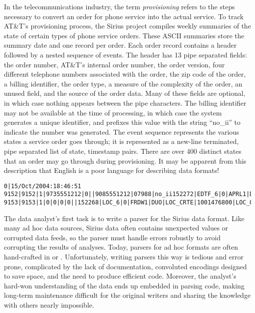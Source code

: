 \documentclass{sigplanconf}
\newcommand{\dibbler}{Sirius}
\begin{document}
In the telecommunications industry, the term \textit{provisioning} refers to
the steps necessary to convert an order for phone service into the
actual service.  To track AT\&T's provisioning process, the \dibbler{}
project compiles weekly summaries of the state of certain types of
phone service orders.  These ASCII summaries store the summary date
and one record per order.  Each order record contains a header
followed by a nested sequence of events.  The header has 13 pipe
separated fields: the order number, AT\&T's internal order number, the
order version, four different telephone numbers associated with the
order, the zip code of the order, a billing identifier, the order
type, a measure of the complexity of the order, an unused field, and
the source of the order data.  Many of these fields are optional, in
which case nothing appears between the pipe characters.  The billing
identifier may not be available at the time of processing, in which
case the system generates a unique identifier, and prefixes this value
with the string ``no\_ii'' to indicate the number was generated. The
event sequence represents the various states a service order goes
through; it is represented as a new-line terminated, pipe separated
list of state, timestamp pairs.  There are over 400 distinct states
that an order may go through during provisioning.  It may be apparent from
this description that English is a poor language for describing data
formats!

\begin{figure*}
\begin{small}
\begin{center}
\begin{verbatim}
0|15/Oct/2004:18:46:51
9152|9152|1|9735551212|0||9085551212|07988|no_ii152272|EDTF_6|0|APRL1|DUO|10|16/Oct/2004:10:02:10
9153|9153|1|0|0|0|0||152268|LOC_6|0|FRDW1|DUO|LOC_CRTE|1001476800|LOC_OS_10|17/Oct/2004:08:14:21
\end{verbatim}
\caption{Tiny example of \dibbler{} provisioning data.}
\label{figure:dibbler-records}
\end{center}
\end{small}
\end{figure*}

The data analyst's first task is to write a parser for the
\dibbler{} data  format.  Like many ad hoc data sources, \dibbler{} data
often contains unexpected values or corrupted data feeds, so the
parser must handle errors robustly to avoid corrupting the results of
analyses.  Today, parsers for ad hoc formats are often hand-crafted in 
\perl{} or \C{}.  Unfortunately, writing parsers this way is tedious and
error prone, complicated by the lack of documentation, convoluted
encodings designed to save space, and the need to produce efficient
code.  Moreover, the analyst's hard-won understanding of the data ends
up embedded in parsing code, making long-term maintenance difficult
for the original writers and sharing the knowledge with others nearly
impossible.
\end{document}
